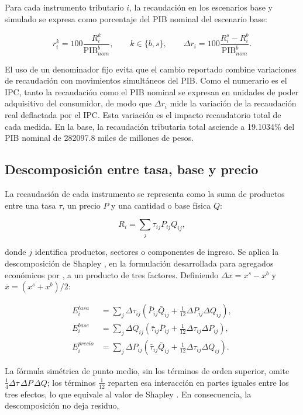 \documentclass[11pt]{article}
\begin{document}
Para cada instrumento tributario \(i\), la recaudación en los escenarios base y simulado se expresa como porcentaje del PIB nominal del escenario base:

\[
r_i^k=100\frac{R_i^k}{\mathrm{PIB}_{nom}^{b}},
\qquad k\in\{b,s\},
\qquad
\Delta r_i=100\frac{R_i^s-R_i^b}{\mathrm{PIB}_{nom}^{b}}.
\]

El uso de un denominador fijo evita que el cambio reportado combine variaciones de recaudación con movimientos simultáneos del PIB. Como el numerario es el IPC, tanto la recaudación como el PIB nominal se expresan en unidades de poder adquisitivo del consumidor, de modo que $\Delta r_i$ mide la variación de la recaudación real deflactada por el IPC. Esta variación es el impacto recaudatorio total de cada medida. En la base, la recaudación tributaria total asciende a 19.1034\% del PIB nominal de 282097.8 miles de millones de pesos.

\subsection{Descomposición entre tasa, base y precio}
\label{sec:metodologia-descomp}

La recaudación de cada instrumento se representa como la suma de productos entre una tasa \(\tau\), un precio \(P\) y una cantidad o base física \(Q\):

\[
R_i=\sum_j \tau_{ij}P_{ij}Q_{ij},
\]

donde \(j\) identifica productos, sectores o componentes de ingreso. Se aplica la descomposición de Shapley \cite{shapley_1953}, en la formulación desarrollada para agregados económicos por \cite{shorrocks_2013}, a un producto de tres factores. Definiendo \(\Delta x=x^s-x^b\) y \(\bar{x}=(x^s+x^b)/2\):

\begin{align*}
E_i^{tasa} &= \sum_j \Delta\tau_{ij}\left(\bar P_{ij}\bar Q_{ij}+\tfrac{1}{12}\Delta P_{ij}\Delta Q_{ij}\right),\\
E_i^{base} &= \sum_j \Delta Q_{ij}\left(\bar\tau_{ij}\bar P_{ij}+\tfrac{1}{12}\Delta\tau_{ij}\Delta P_{ij}\right),\\
E_i^{precio} &= \sum_j \Delta P_{ij}\left(\bar\tau_{ij}\bar Q_{ij}+\tfrac{1}{12}\Delta\tau_{ij}\Delta Q_{ij}\right).
\end{align*}

La fórmula simétrica de punto medio, sin los términos de orden superior, omite \(\tfrac{1}{4}\Delta\tau\,\Delta P\,\Delta Q\); los términos \(\tfrac{1}{12}\) reparten esa interacción en partes iguales entre los tres efectos, lo que equivale al valor de Shapley \cite{sun_1998,albrecht_2002}. En consecuencia, la descomposición no deja residuo,
\end{document}

